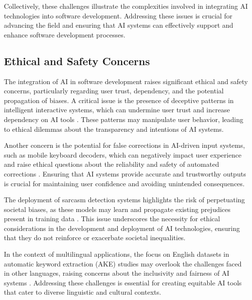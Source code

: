 Collectively, these challenges illustrate the complexities involved in integrating AI technologies into software development. Addressing these issues is crucial for advancing the field and ensuring that AI systems can effectively support and enhance software development processes.


\subsection{Ethical and Safety Concerns} \label{subsec:Ethical and Safety Concerns}

The integration of AI in software development raises significant ethical and safety concerns, particularly regarding user trust, dependency, and the potential propagation of biases. A critical issue is the presence of deceptive patterns in intelligent interactive systems, which can undermine user trust and increase dependency on AI tools \cite{benharrak2024deceptivepatternsintelligentinteractive}. These patterns may manipulate user behavior, leading to ethical dilemmas about the transparency and intentions of AI systems.



Another concern is the potential for false corrections in AI-driven input systems, such as mobile keyboard decoders, which can negatively impact user experience and raise ethical questions about the reliability and safety of automated corrections \cite{ouyang2017mobilekeyboardinputdecoding}. Ensuring that AI systems provide accurate and trustworthy outputs is crucial for maintaining user confidence and avoiding unintended consequences.



The deployment of sarcasm detection systems highlights the risk of perpetuating societal biases, as these models may learn and propagate existing prejudices present in training data \cite{nimase2024morecontextshelpsarcasm}. This issue underscores the necessity for ethical considerations in the development and deployment of AI technologies, ensuring that they do not reinforce or exacerbate societal inequalities.



In the context of multilingual applications, the focus on English datasets in automatic keyword extraction (AKE) studies may overlook the challenges faced in other languages, raising concerns about the inclusivity and fairness of AI systems \cite{altuncu2022improvingperformanceautomatickeyword}. Addressing these challenges is essential for creating equitable AI tools that cater to diverse linguistic and cultural contexts.



